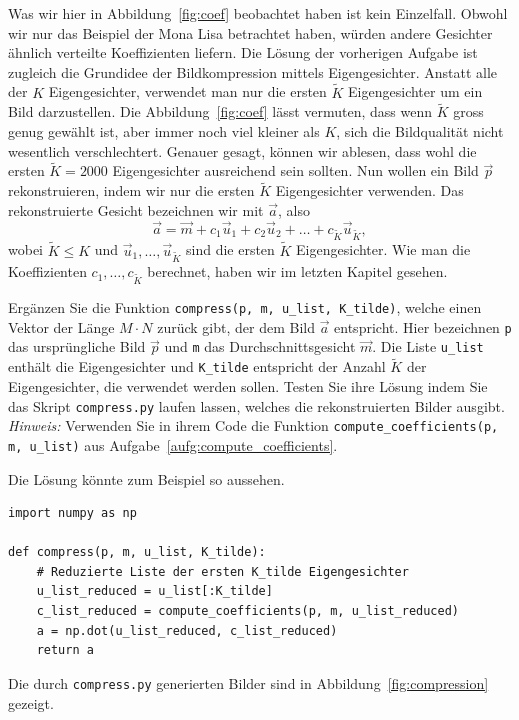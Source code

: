 Was wir hier in Abbildung~\ref{fig:coef} beobachtet haben ist kein Einzelfall.
Obwohl wir nur das Beispiel der Mona Lisa betrachtet haben, würden andere Gesichter ähnlich verteilte Koeffizienten liefern.
Die Lösung der vorherigen Aufgabe ist zugleich die Grundidee der Bildkompression mittels Eigengesichter.
Anstatt alle der $K$ Eigengesichter, verwendet man nur die ersten $\tilde K$ Eigengesichter um ein Bild darzustellen.
Die Abbildung~\ref{fig:coef} lässt vermuten, dass wenn $\tilde K$ gross genug gewählt ist, aber immer noch viel kleiner als $K$, sich die Bildqualität nicht wesentlich verschlechtert.
Genauer gesagt, können wir ablesen, dass wohl die ersten $\tilde K=2000$ Eigengesichter ausreichend sein sollten.
Nun wollen ein Bild $\vec p$ rekonstruieren, indem wir nur die ersten $\tilde K$ Eigengesichter verwenden.
Das rekonstruierte Gesicht bezeichnen wir mit $\vec a$, also
\begin{equation*}
	\vec a=\vec m+c_1\vec u_1+c_2\vec u_2+\ldots+c_{\tilde K}\vec u_{\tilde K},
\end{equation*}
wobei $\tilde K\leq K$ und $\vec u_1,\ldots,\vec u_{\tilde K}$ sind die ersten $\tilde K$ Eigengesichter.
Wie man die Koeffizienten $c_1,\ldots,c_{\tilde K}$ berechnet, haben wir im letzten Kapitel gesehen.
\begin{aufgabe}
	Ergänzen Sie die Funktion \texttt{compress(p, m, u\_list, K\_tilde)}, welche einen Vektor der Länge $M\cdot N$ zurück gibt, der dem Bild $\vec a$ entspricht.
	Hier bezeichnen \texttt{p} das ursprüngliche Bild $\vec p$ und \texttt{m} das Durchschnittsgesicht $\vec m$.
	Die Liste \texttt{u\_list} enthält die Eigengesichter und \texttt{K\_tilde} entspricht der Anzahl $\tilde K$ der Eigengesichter, die verwendet werden sollen.
	Testen Sie ihre Lösung indem Sie das Skript \texttt{compress.py} laufen lassen, welches die rekonstruierten Bilder ausgibt.
	\textit{Hinweis:} Verwenden Sie in ihrem Code die Funktion \texttt{compute\_coefficients(p, m, u\_list)} aus Aufgabe~\ref{aufg:compute_coefficients}.
\end{aufgabe}
\begin{losung*}
	Die Lösung könnte zum Beispiel so aussehen.
\begin{lstlisting}[style=python]
import numpy as np

def compress(p, m, u_list, K_tilde):
	# Reduzierte Liste der ersten K_tilde Eigengesichter
	u_list_reduced = u_list[:K_tilde]
	c_list_reduced = compute_coefficients(p, m, u_list_reduced)
	a = np.dot(u_list_reduced, c_list_reduced)
	return a
\end{lstlisting}
Die durch \texttt{compress.py} generierten Bilder sind in Abbildung~\ref{fig:compression} gezeigt.
\end{losung*}
